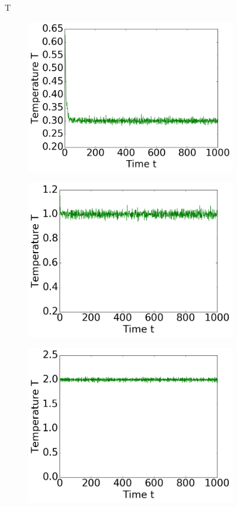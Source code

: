 \begin{figure}[ht]
T
\hfill
\begin{subfigure}{0.3\textwidth}
\includegraphics[width=\textwidth]{../dat/Temperature_T0d3.png}
\end{subfigure}
\hfill
\begin{subfigure}{0.3\textwidth}
\includegraphics[width=\textwidth]{../dat/Temperature_T1d0.png}
\end{subfigure}
\hfill
\begin{subfigure}{0.3\textwidth}
\includegraphics[width=\textwidth]{../dat/Temperature_T2d0.png}

\end{subfigure}
\end{figure}
